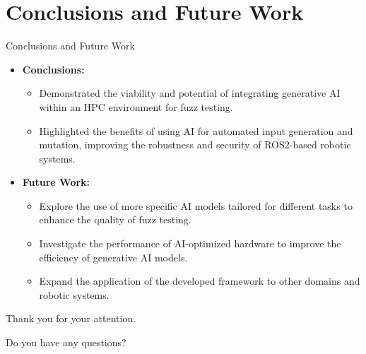 \documentclass[aspectratio=169]{beamer}
\begin{document}
\section{Conclusions and Future Work}
\begin{frame}{Conclusions and Future Work}
\begin{tcolorbox}[drop shadow southeast, enhanced, colback=blue!5!white, colframe=Azuloscuro-cisis]
\begin{itemize}
    \item \textbf{Conclusions:}
    \begin{itemize}
        \item Demonstrated the viability and potential of integrating generative AI within an HPC environment for fuzz testing.
        \item Highlighted the benefits of using AI for automated input generation and mutation, improving the robustness and security of ROS2-based robotic systems.
    \end{itemize}
    \item \textbf{Future Work:}
    \begin{itemize}
        \item Explore the use of more specific AI models tailored for different tasks to enhance the quality of fuzz testing.
        \item Investigate the performance of AI-optimized hardware to improve the efficiency of generative AI models.
        \item Expand the application of the developed framework to other domains and robotic systems.
    \end{itemize}
\end{itemize}
\end{tcolorbox}
\end{frame}


\begin{frame}
\begin{center}
{\centering\Huge\textcolor{black!50}{Thank you for your attention.}\par Do you have any questions?}%
\end{center}
    
\end{frame}


%
%
%    
%    
%
\end{document}
